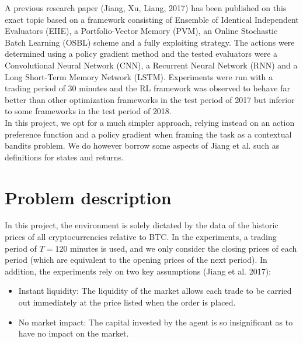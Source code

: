 \documentclass[a4paper,12pt]{article}
\begin{document}
A previous research paper (Jiang, Xu, Liang, 2017) \cite{jiang} has been published on this exact topic based on a framework consisting of Ensemble of Identical Independent Evaluators (EIIE), a Portfolio-Vector Memory (PVM), an Online Stochastic Batch Learning (OSBL) scheme and a fully exploiting strategy. The actions were determined using a policy gradient method and the tested evaluators were a Convolutional Neural Network (CNN), a Recurrent Neural Network (RNN) and a Long Short-Term Memory Network (LSTM). Experiments were run with a trading period of 30 minutes and the RL framework was observed to behave far better than other optimization frameworks in the test period of 2017 but inferior to some frameworks in the test period of 2018. \\

In this project, we opt for a much simpler approach, relying instead on an action preference function and a policy gradient when framing the task as a contextual bandits problem. We do however borrow some aspects of Jiang et al. such as definitions for states and returns. \\

\section{Problem description}
In this project, the environment is solely dictated by the data of the historic prices of all cryptocurrencies relative to BTC. In the experiments, a trading period of $T = 120$ minutes is used, and we only consider the closing prices of each period (which are equivalent to the opening prices of the next period). In addition, the experiments rely on two key assumptions (Jiang et al. 2017):

\begin{itemize}
  \item Instant liquidity: The liquidity of the market allows each trade to be carried out immediately at the price listed when the order is placed.
  \item No market impact: The capital invested by the agent is so insignificant as to have no impact on the market.
\end{itemize}
\end{document}
